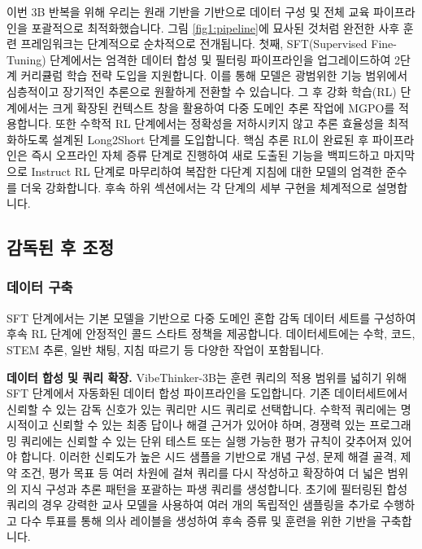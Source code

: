 \documentclass{article}
\begin{document}
이번 3B 반복을 위해 우리는 원래 기반을 기반으로 데이터 구성 및 전체 교육 파이프라인을 포괄적으로 최적화했습니다. 그림 \ref{fig1:pipeline}에 묘사된 것처럼 완전한 사후 훈련 프레임워크는 단계적으로 순차적으로 전개됩니다. 첫째, SFT(Supervised Fine-Tuning) 단계에서는 엄격한 데이터 합성 및 필터링 파이프라인을 업그레이드하여 2단계 커리큘럼 학습 전략 도입을 지원합니다. 이를 통해 모델은 광범위한 기능 범위에서 심층적이고 장기적인 추론으로 원활하게 전환할 수 있습니다. 그 후 강화 학습(RL) 단계에서는 크게 확장된 컨텍스트 창을 활용하여 다중 도메인 추론 작업에 MGPO를 적용합니다. 또한 수학적 RL 단계에서는 정확성을 저하시키지 않고 추론 효율성을 최적화하도록 설계된 Long2Short 단계를 도입합니다. 핵심 추론 RL이 완료된 후 파이프라인은 즉시 오프라인 자체 증류 단계로 진행하여 새로 도출된 기능을 백피드하고 마지막으로 Instruct RL 단계로 마무리하여 복잡한 다단계 지침에 대한 모델의 엄격한 준수를 더욱 강화합니다. 후속 하위 섹션에서는 각 단계의 세부 구현을 체계적으로 설명합니다.



\subsection{감독된 후 조정}

\subsubsection{데이터 구축}

SFT 단계에서는 기본 모델을 기반으로 다중 도메인 혼합 감독 데이터 세트를 구성하여 후속 RL 단계에 안정적인 콜드 스타트 ​​정책을 제공합니다. 데이터세트에는 수학, 코드, STEM 추론, 일반 채팅, 지침 따르기 등 다양한 작업이 포함됩니다.

\textbf{데이터 합성 및 쿼리 확장.} VibeThinker-3B는 훈련 쿼리의 적용 범위를 넓히기 위해 SFT 단계에서 자동화된 데이터 합성 파이프라인을 도입합니다. 기존 데이터세트에서 신뢰할 수 있는 감독 신호가 있는 쿼리만 시드 쿼리로 선택합니다. 수학적 쿼리에는 명시적이고 신뢰할 수 있는 최종 답이나 해결 근거가 있어야 하며, 경쟁력 있는 프로그래밍 쿼리에는 신뢰할 수 있는 단위 테스트 또는 실행 가능한 평가 규칙이 갖추어져 있어야 합니다. 이러한 신뢰도가 높은 시드 샘플을 기반으로 개념 구성, 문제 해결 골격, 제약 조건, 평가 목표 등 여러 차원에 걸쳐 쿼리를 다시 작성하고 확장하여 더 넓은 범위의 지식 구성과 추론 패턴을 포괄하는 파생 쿼리를 생성합니다. 초기에 필터링된 합성 쿼리의 경우 강력한 교사 모델을 사용하여 여러 개의 독립적인 샘플링을 추가로 수행하고 다수 투표를 통해 의사 레이블을 생성하여 후속 증류 및 훈련을 위한 기반을 구축합니다.
\end{document}
